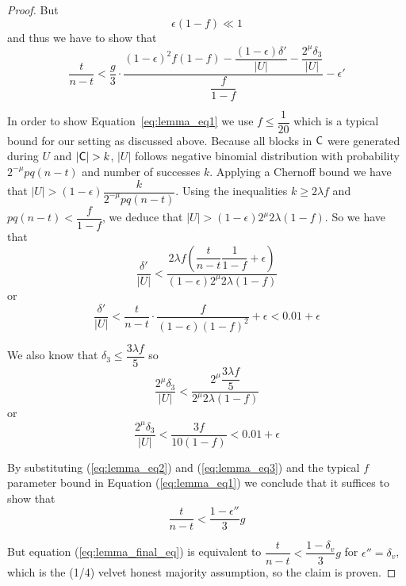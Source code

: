 \begin{proof}
But
\begin{equation*}
    \epsilon(1-f) \ll 1
\end{equation*} and
thus we have to show that
\begin{equation}\label{eq:lemma_eq1}
    \dfrac{t}{n-t} < \dfrac{g}{3} \cdot \dfrac{(1-\epsilon)^2 f(1-f) - \dfrac{(1-\epsilon)\delta'}{\lvert U \rvert} - \dfrac{2^\mu \delta_3}{\lvert U \rvert} }{\dfrac{f}{1-f}} - \epsilon'
\end{equation}

In order to show Equation~\ref{eq:lemma_eq1} we use $f \leq \dfrac{1}{20}$ which is a typical bound for our setting as discussed above.
Because all blocks in $\mathsf{C}$ were generated during $U$ and $\lvert \mathsf{C} \rvert > k $, $\lvert U \rvert$ follows negative binomial distribution with probability $2^{-\mu} pq(n-t)$ and number of successes $k$.
Applying a Chernoff bound we have that $\lvert U \rvert > (1-\epsilon) \dfrac{k}{2^{-\mu} pq(n-t)}$. Using the inequalities $k \geq 2\lambda f$ and $pq(n-t) < \dfrac{f}{1-f}$, we deduce that $\lvert U \rvert > (1-\epsilon) 2^{\mu}2\lambda(1-f)$. So we have that
\begin{equation*}
    \dfrac{\delta'}{\lvert U \rvert} < \dfrac{2\lambda f (\dfrac{t}{n-t} \dfrac{1}{1-f} + \epsilon)}{(1-\epsilon)2^{\mu}2\lambda (1-f)}
\end{equation*} or
\begin{equation}\label{eq:lemma_eq2}
    \dfrac{\delta'}{\lvert U \rvert} < \dfrac{t}{n-t} \cdot \dfrac{f}{(1-\epsilon)(1-f)^2} + \epsilon < 0.01 + \epsilon
\end{equation}

We also know that $\delta_3 \leq \dfrac{ 3\lambda f}{5}$ so
\begin{equation*}
    \dfrac{2^{\mu} \delta_3}{\lvert U \rvert} < \dfrac{2^\mu \dfrac{ 3\lambda f}{5}}{2^{\mu} 2 \lambda (1-f)}
\end{equation*} or
\begin{equation}\label{eq:lemma_eq3}
    \dfrac{2^{\mu} \delta_3}{\lvert U \rvert} < \dfrac{3f}{10(1-f)} < 0.01 + \epsilon
\end{equation}

By substituting (\ref{eq:lemma_eq2}) and (\ref{eq:lemma_eq3}) and the typical $f$ parameter bound in Equation (\ref{eq:lemma_eq1}) we conclude that it suffices to show that
\begin{equation}\label{eq:lemma_final_eq}
    \dfrac{t}{n-t} < \dfrac{1-\epsilon''}{3}g
\end{equation}

But equation (\ref{eq:lemma_final_eq}) is equivalent to $\dfrac{t}{n-t} < \dfrac{1-\delta_v}{3}g$ for $\epsilon'' = \delta_v$, which is the (1/4) velvet honest majority assumption, so the claim is proven.
\end{proof}


